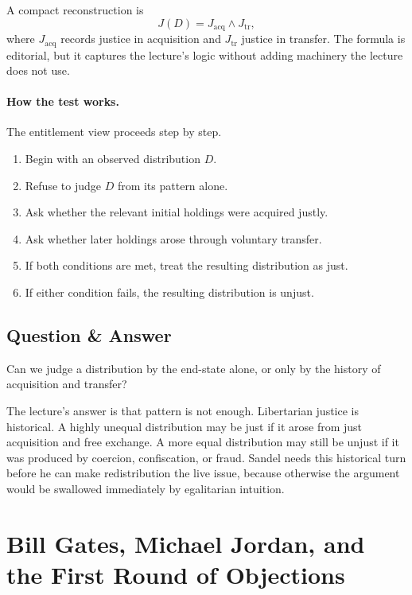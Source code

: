 A compact reconstruction is
\begin{equation}
J(D)=J_{\mathrm{acq}} \land J_{\mathrm{tr}},
\end{equation}
where \(J_{\mathrm{acq}}\) records justice in acquisition and \(J_{\mathrm{tr}}\) justice in transfer. The formula is editorial, but it captures the lecture's logic without adding machinery the lecture does not use.

\paragraph{How the test works.}
The entitlement view proceeds step by step.
\begin{enumerate}
\item Begin with an observed distribution \(D\).
\item Refuse to judge \(D\) from its pattern alone.
\item Ask whether the relevant initial holdings were acquired justly.
\item Ask whether later holdings arose through voluntary transfer.
\item If both conditions are met, treat the resulting distribution as just.
\item If either condition fails, the resulting distribution is unjust.
\end{enumerate}

\subsection{Question \& Answer}

Can we judge a distribution by the end-state alone, or only by the history of acquisition and transfer?

The lecture's answer is that pattern is not enough. Libertarian justice is historical. A highly unequal distribution may be just if it arose from just acquisition and free exchange. A more equal distribution may still be unjust if it was produced by coercion, confiscation, or fraud. Sandel needs this historical turn before he can make redistribution the live issue, because otherwise the argument would be swallowed immediately by egalitarian intuition.

\section{Bill Gates, Michael Jordan, and the First Round of Objections}

